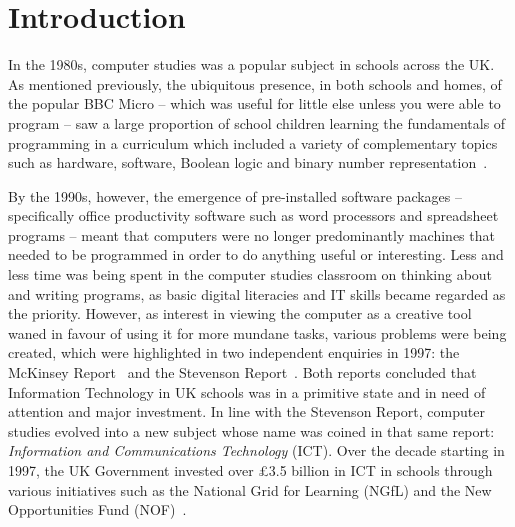 \documentclass{sig-alternate}
\begin{document}


\section{Introduction}\label{intro}


In the 1980s, computer studies was a popular subject in schools across
the UK. As mentioned previously, the ubiquitous presence, in both
schools and homes, of the popular BBC Micro -- which was useful for
little else unless you were able to program -- saw a large proportion
of school children learning the fundamentals of programming in a
curriculum which included a variety of complementary topics such as
hardware, software, Boolean logic and binary number
representation~\cite{Doyle:1988}.


By the 1990s, however, the emergence of pre-installed software
packages -- specifically office productivity software such as word
processors and spreadsheet programs -- meant that computers were no
longer predominantly machines that needed to be programmed in order to
do anything useful or interesting.  Less and less time was being spent
in the computer studies classroom on thinking about and writing
programs, as basic digital literacies and IT skills became regarded as
the priority. However, as interest in viewing the computer as a
creative tool waned in favour of using it for more mundane tasks,
various problems were being created, which were highlighted in two
independent enquiries in 1997: the McKinsey
Report~\cite{McKinsey:1997} and the Stevenson
Report~\cite{Stevenson:1997}.  Both reports concluded that Information
Technology in UK schools was in a primitive state and in need of
attention and major investment. In line with the Stevenson Report,
computer studies evolved into a new subject whose name was coined in
that same report: {\emph{Information and Communications Technology}}
(ICT).  Over the decade starting in 1997, the UK Government invested
over \pounds3.5 billion in ICT in schools through various initiatives
such as the National Grid for Learning (NGfL) and the New
Opportunities Fund (NOF)~\cite{Doughty:2006}.
\end{document}
